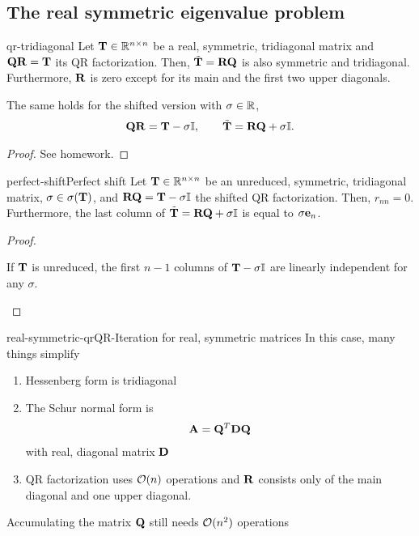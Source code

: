 \subsection{The real symmetric eigenvalue problem}

\begin{Lemma}{qr-tridiagonal}
  Let $\mathbf T\in\mathbb R^{n\times n}$ be a real, symmetric, tridiagonal matrix and
  $\mathbf Q\mathbf R=\mathbf T$ its QR factorization. Then, $\tilde{\mathbf T}=\mathbf R\mathbf Q$ is also
  symmetric and tridiagonal. Furthermore, $\mathbf R$ is zero except for
  its main and the first two upper diagonals.

  The same holds for the shifted version with $\sigma\in\mathbb R$,
  \begin{gather}
    \mathbf Q\mathbf R = \mathbf T-\sigma\mathbb I,\qquad \tilde{\mathbf T} = \mathbf R\mathbf Q+\sigma\mathbb I.
  \end{gather}
\end{Lemma}

\begin{proof}
  See homework.
\end{proof}

\begin{Lemma*}{perfect-shift}{Perfect shift}
  Let $\mathbf T\in\mathbb R^{n\times n}$ be an unreduced, symmetric, tridiagonal matrix,
  $\sigma\in\sigma(\mathbf T)$, and $\mathbf R\mathbf Q=\mathbf T-\sigma\mathbb I$ the
  shifted QR factorization. Then, $r_{nn}=0$. Furthermore, the last
  column of $\tilde{\mathbf T} = \mathbf R\mathbf Q+\sigma\mathbb I$ is equal to
  $\sigma\mathbf e_n$.
\end{Lemma*}

\begin{proof}
  \begin{todo}
  If $\mathbf T$ is unreduced, the first $n-1$ columns of
  $\mathbf T-\sigma\mathbb I$ are linearly independent for any $\sigma$.    
  \end{todo}
\end{proof}

\begin{Remark*}{real-symmetric-qr}{QR-Iteration for real, symmetric matrices}
  In this case, many things simplify
  \begin{enumerate}
  \item Hessenberg form is tridiagonal
  \item The Schur normal form is
    \begin{gather}
      \mathbf A = \mathbf Q^T\mathbf D\mathbf Q
    \end{gather}
    with real, diagonal matrix $\mathbf D$
  \item QR factorization uses $\mathcal O(n)$ operations and $\mathbf R$
    consists only of the main diagonal and one upper diagonal.
  \end{enumerate}
  Accumulating the matrix $\mathbf Q$ still needs $\mathcal O(n^2)$ operations
\end{Remark*}

